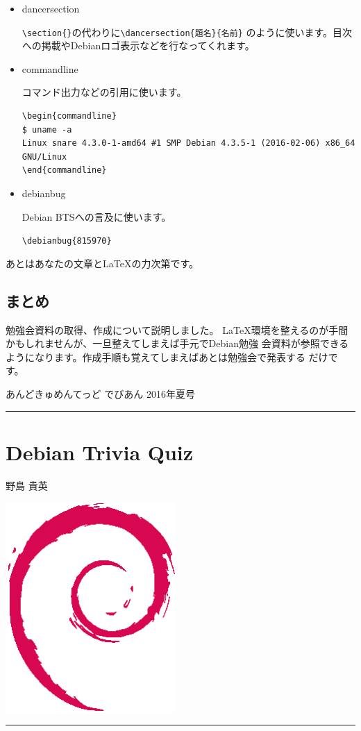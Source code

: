 \documentclass[mingoth,a4paper]{jsarticle}
\renewcommand{\dancersection}[2]{%
\newpage
あんどきゅめんてっど でびあん 2016年夏号
%
\vspace{0.1mm}\\
{\color{dancerdarkblue}\rule{\hsize}{2mm}}

%
%
\begin{minipage}[t]{0.6\hsize}
\color{dancerdarkblue}
\vspace{1cm}
\section{#1}
\hfill{}#2\\
\end{minipage}
\begin{minipage}[t]{0.4\hsize}
\vspace{-2cm}
\hfill{}\includegraphics[height=8cm]{image200502/openlogo-nd.eps}\\
\vspace{-5cm}
\end{minipage}
%
{\color{dancerlightblue}\rule{0.66\hsize}{2mm}}
%
\vspace{2cm}
}
\begin{document}
\begin{itemize}
\item dancersection

  \verb|\section{}|の代わりに\verb|\dancersection{題名}{名前}|
  のように使います。目次への掲載やDebianロゴ表示などを行なってくれます。
\item commandline

  コマンド出力などの引用に使います。
\begin{verbatim}
\begin{commandline}
$ uname -a
Linux snare 4.3.0-1-amd64 #1 SMP Debian 4.3.5-1 (2016-02-06) x86_64 GNU/Linux
\end{commandline}
\end{verbatim}
\item debianbug

  Debian BTSへの言及に使います。

  \verb|\debianbug{815970}|

\end{itemize}

あとはあなたの文章と\LaTeX{}の力次第です。

\subsection{まとめ}

勉強会資料の取得、作成について説明しました。
\LaTeX{}環境を整えるのが手間かもしれませんが、一旦整えてしまえば手元でDebian勉強
会資料が参照できるようになります。作成手順も覚えてしまえばあとは勉強会で発表する
だけです。




\dancersection{Debian Trivia Quiz}{野島 貴英}
\end{document}
